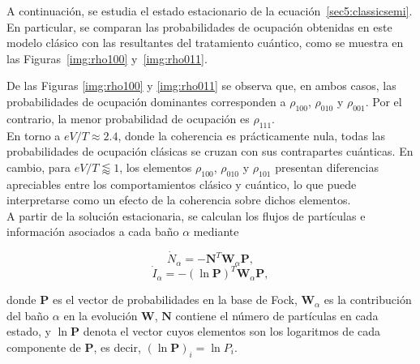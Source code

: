 A continuación, se estudia el estado estacionario de la ecuación~\eqref{sec5:classicsemi}. En particular, se comparan las probabilidades de ocupación obtenidas en este modelo clásico con las resultantes del tratamiento cuántico, como se muestra en las Figuras~\ref{img:rho100} y~\ref{img:rho011}. 


De las Figuras \ref{img:rho100} y \ref{img:rho011} se observa que, en ambos casos, las probabilidades de ocupación dominantes corresponden a $\rho_{100}$, $\rho_{010}$ y $\rho_{001}$. Por el contrario, la menor probabilidad de ocupación es $\rho_{111}$.
\\

En torno a $eV/T \approx 2.4$, donde la coherencia es prácticamente nula, todas las probabilidades de ocupación clásicas se cruzan con sus contrapartes cuánticas. En cambio, para $eV/T \lessapprox 1$, los elementos $\rho_{100}$, $\rho_{010}$ y $\rho_{101}$ presentan diferencias apreciables entre los comportamientos clásico y cuántico, lo que puede interpretarse como un efecto de la coherencia sobre dichos elementos.
\\

A partir de la solución estacionaria, se calculan los flujos de partículas e información asociados a cada baño $\alpha$ mediante

\begin{equation}
    \dot{N}_{\alpha} = -\mathbf{N}^{T} \mathbf{W}_{\alpha}\mathbf{P},
    \label{sec5:currentsemi}
\end{equation}
\begin{equation}
    \dot{I}_{\alpha} = -(\ln \mathbf{P})^{T} \mathbf{W}_{\alpha}\mathbf{P},
    \label{sec5:infosemi}
\end{equation}

donde $\mathbf{P}$ es el vector de probabilidades en la base de Fock, $\mathbf{W}_{\alpha}$ es la contribución del baño $\alpha$ en la evolución $\mathbf{W}$, $\mathbf{N}$ contiene el número de partículas en cada estado, y $\ln \mathbf{P}$ denota el vector cuyos elementos son los logaritmos de cada componente de $\mathbf{P}$, es decir, $(\ln \mathbf{P})_i = \ln P_i$\cite{monsel2025autonomous}.
\\

